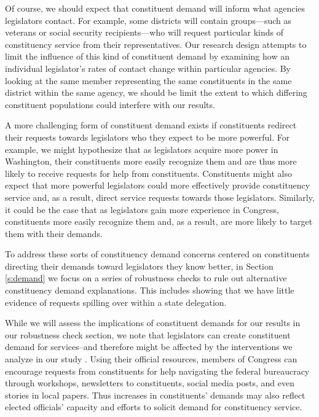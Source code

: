 \documentclass[12pt]{article}
\begin{document}
Of course, we should expect that constituent demand will inform what agencies legislators contact. For example, some districts will contain groups---such as veterans or social security recipients---who will request particular kinds of constituency service from their representatives. Our research design attempts to limit the influence of this kind of constituent demand by examining how an individual legislator's rates of contact change within particular agencies. By looking at the same member representing the same constituents in the same district within the same agency, we should be limit the extent to which differing constituent populations could interfere with our results. 

A more challenging form of constituent demand exists if constituents redirect their requests towards legislators who they expect to be more powerful. For example, we might hypothesize that as legislators acquire more power in Washington, their constituents more easily recognize them and are thus more likely to receive requests for help from constituents. Constituents might also expect that more powerful legislators could more effectively provide constituency service and, as a result, direct service requests towards those legislators. Similarly, it could be the case that as legislators gain more experience in Congress, constituents more easily recognize them and, as a result, are more likely to target them with their demands. 

To address these sorts of constituency demand concerns centered on constituents directing their demands toward legislators they know better, in Section \ref{s:demand} we focus on a series of robustness checks to rule out alternative constituency demand explanations. This includes showing that we have little evidence of requests spilling over within a state delegation.   

While we will assess the implications of constituent demands for our results in our robustness check section, we note that legislators can create constituent demand for services--and therefore might be affected by the interventions we analyze in our study \citep{CainFerejohnFiorina1987}. Using their official resources, members of Congress can encourage requests from constituents for help navigating the federal bureaucracy through workshops, newsletters to constituents, social media posts, and even stories in local papers. Thus increases in constituents' demands may also reflect elected officials' capacity and efforts to solicit demand for constituency service.
\end{document}
